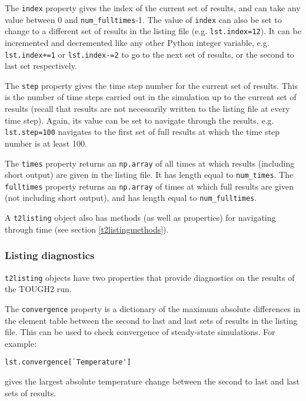The \texttt{index} property gives the index of the current set of results, and can take any value between 0 and \texttt{num\_fulltimes}-1.  The value of \texttt{index} can also be set to change to a different set of results in the listing file (e.g. \texttt{lst.index=12}).  It can be incremented and decremented like any other Python integer variable, e.g. \texttt{lst.index+=1} or \texttt{lst.index-=2} to go to the next set of results, or the second to last set respectively.

The \texttt{step} property gives the time step number for the current set of results.  This is the number of time steps carried out in the simulation up to the current set of results (recall that results are not necessarily written to the listing file at every time step).  Again, its value can be set to navigate through the results, e.g. \texttt{lst.step=100} navigates to the first set of full results at which the time step number is at least 100.

The \texttt{times} property returns an \texttt{np.array} of all times at which results (including short output) are given in the listing file.  It has length equal to \texttt{num\_times}.  The \texttt{fulltimes} property returns an \texttt{np.array} of times at which full results are given (not including short output), and has length equal to \texttt{num\_fulltimes}.

A \texttt{t2listing} object also has methods (as well as properties) for navigating through time (see section \ref{t2listingmethods}).

\subsubsection{Listing diagnostics}

\texttt{t2listing} objects have two properties that provide diagnostics on the results of the TOUGH2 run.

The \texttt{convergence} property is a dictionary of the maximum absolute differences in the element table between the second to last and last sets of results in the listing file.  This can be used to check convergence of steady-state simulations.  For example:

\begin{verbatim}
lst.convergence[`Temperature']
\end{verbatim}

gives the largest absolute temperature change between the second to last and last sets of results.

